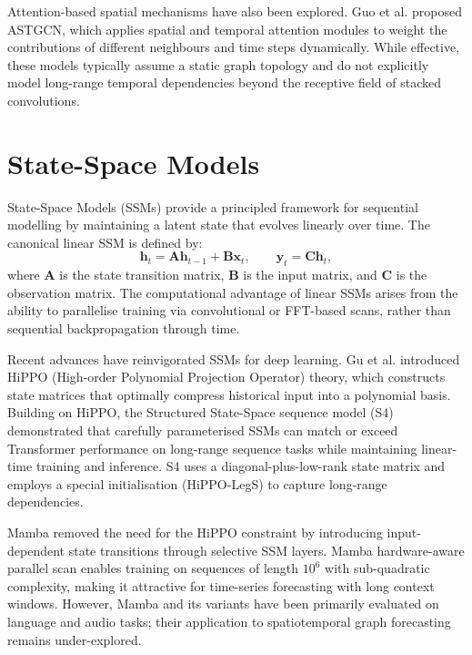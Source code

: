 Attention-based spatial mechanisms have also been explored. Guo et al. \cite{guo2019astgcn} proposed ASTGCN, which applies spatial and temporal attention modules to weight the contributions of different neighbours and time steps dynamically. While effective, these models typically assume a static graph topology and do not explicitly model long-range temporal dependencies beyond the receptive field of stacked convolutions.

\section{State-Space Models}
\label{sec:ssm}

State-Space Models (SSMs) provide a principled framework for sequential modelling by maintaining a latent state that evolves linearly over time. The canonical linear SSM is defined by:
\begin{equation}
    \mathbf{h}_t = \mathbf{A} \mathbf{h}_{t-1} + \mathbf{B} \mathbf{x}_t, \qquad
    \mathbf{y}_t = \mathbf{C} \mathbf{h}_t,
    \label{eq:linear_ssm}
\end{equation}
where $\mathbf{A}$ is the state transition matrix, $\mathbf{B}$ is the input matrix, and $\mathbf{C}$ is the observation matrix. The computational advantage of linear SSMs arises from the ability to parallelise training via convolutional or FFT-based scans, rather than sequential backpropagation through time.

Recent advances have reinvigorated SSMs for deep learning. Gu et al. \cite{gu2020hippo} introduced HiPPO (High-order Polynomial Projection Operator) theory, which constructs state matrices that optimally compress historical input into a polynomial basis. Building on HiPPO, the Structured State-Space sequence model (S4) \cite{gu2022efficiently} demonstrated that carefully parameterised SSMs can match or exceed Transformer performance on long-range sequence tasks while maintaining linear-time training and inference. S4 uses a diagonal-plus-low-rank state matrix and employs a special initialisation (HiPPO-LegS) to capture long-range dependencies.

Mamba \cite{gu2023mamba} removed the need for the HiPPO constraint by introducing input-dependent state transitions through selective SSM layers. Mamba hardware-aware parallel scan enables training on sequences of length $10^6$ with sub-quadratic complexity, making it attractive for time-series forecasting with long context windows. However, Mamba and its variants have been primarily evaluated on language and audio tasks; their application to spatiotemporal graph forecasting remains under-explored.

